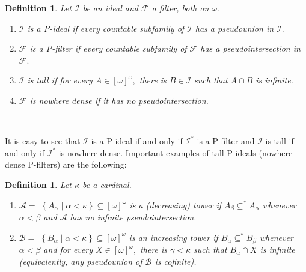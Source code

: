 \documentclass{article}%
\newtheorem{definition}[theorem]{Definition}
\begin{document}
\begin{definition}
Let $\mathcal{I}$ be an ideal and $\mathcal{F}$ a filter, both on $\omega.$

\begin{enumerate}
\item $\mathcal{I}$ is a \textsf{P}\emph{-ideal} if every countable subfamily
of $\mathcal{I}$ has a pseudounion in $\mathcal{I}.$

\item $\mathcal{F}$ is a \textsf{P}\emph{-filter} if every countable subfamily
of $\mathcal{F}$ has a pseudointersection in $\mathcal{F}.$

\item $\mathcal{I}$ is \emph{tall }if for every $A\in\left[  \omega\right]
^{\omega},$ there is $B\in\mathcal{I}$ such that $A\cap B$ is infinite.

\item $\mathcal{F}$ is \emph{nowhere dense }if it has no pseudointersection.
\end{enumerate}
\end{definition}

\qquad\ \qquad\ \ \ \ 

It is easy to see that $\mathcal{I}$ is a \textsf{P}-ideal if and only if
$\mathcal{I}^{\ast}$ is a \textsf{P}-filter and $\mathcal{I}$ is tall if and
only if $\mathcal{I}^{\ast}$ is nowhere dense. Important examples of tall
\textsf{P}-ideals (nowhere dense \textsf{P}-filters) are the following:

\begin{definition}
Let $\kappa$ be a cardinal.\qquad\ \ \ \qquad\qquad\ \ \ \ 

\begin{enumerate}
\item $\mathcal{A=}$ $\left\{  A_{\alpha}\mid\alpha<\kappa\right\}
\subseteq\left[  \omega\right]  ^{\omega}$ is a \emph{(decreasing) tower} if
$A_{\beta}\subseteq^{\ast}A_{\alpha}$ whenever $\alpha<\beta$ and
$\mathcal{A}$ has no infinite pseudointersection.

\item $\mathcal{B=}$ $\left\{  B_{\alpha}\mid\alpha<\kappa\right\}
\subseteq\left[  \omega\right]  ^{\omega}$ is an \emph{increasing tower} if
$B_{\alpha}\subseteq^{\ast}B_{\beta}$ whenever $\alpha<\beta$ and for every
$X\in\left[  \omega\right]  ^{\omega},$ there is $\gamma<\kappa$ such that
$B_{\alpha}\cap X$ is infinite (equivalently, any pseudounion of $\mathcal{B}$
is cofinite).
\end{enumerate}
\end{definition}
\end{document}
